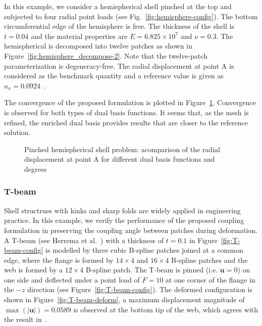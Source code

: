 In this example, we consider a hemispherical shell pinched at the top and subjected to four radial point loads (see Fig.~\ref{fig:hemisphere-config}). The bottom circumferential edge of the hemisphere is free. The thickness of the shell is $t = 0.04$ and the material properties are $E = 6.825\times{}10^7$ and $\nu = 0.3$. The hemispherical is decomposed into twelve patches as shown in Figure~\ref{fig:hemisphere_decompose-2}. Note that the twelve-patch parameterization is degeneracy-free. The radial displacement at point A is considered as the benchmark quantity and a reference value is given as $u_x = 0.0924$~\cite{kiendl2009isogeometric}.\par

The convergence of the proposed formulation is plotted in Figure~\ref{fig:hemisphere_result}. Convergence is observed for both types of dual basis functions. It seems that, as the mesh is refined, the enriched \Bezier dual basis provides results that are closer to the reference solution.
\begin{figure}[h]
	\center
	
	\caption{ Pinched hemispherical shell problem: acomparison of the radial displacement at point A for different dual basis functions and degrees}
	\label{fig:hemisphere_result}
\end{figure}
\FloatBarrier
\subsubsection{T-beam}

Shell structrues with kinks and sharp folds are widely applied in engineering practice. In this example, we verify the performance of the proposed coupling formulation in preserving the coupling angle between patches during deformation. A T-beam (see Herrema et al.~\cite{herrema2019penalty}) with a thickness of $t=0.1$ in Figure~\ref{fig:T-beam-config} is modelled by three cubic B-spline patches joined at a common edge, where the flange is formed by $14\times 4$ and $ 16\times 4$ B-spline patches and the web is formed by a $12\times 4$ B-spline patch. The T-beam is pinned (i.e. $\mathbf{u}=0$) on one side and deflected under a point load of $F = 10$ at one corner of the flange in the $-z$ direction (see Figure~\ref{fig:T-beam-config}). The deformed configuration is shown in Figure~\ref{fig:T-beam-deform}, a maximum displacement magnitude of $\max(\vert \mathbf{u} \vert)=0.0589$ is observed at the bottom tip of the web, which agrees with the result in~\cite{herrema2019penalty}. \par

